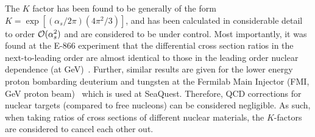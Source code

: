 The $K$ factor has been found to be generally of the form $K = \exp[(\alpha_s/2\pi)(4\pi^2/3)]$, and has been calculated in considerable detail~\cite{Matsuura:1988sm} to order $\mathcal{O}(\alpha_s^2)$ and are considered to be under control. Most importantly, it was found at the E-866 experiment that the differential cross section ratios in the next-to-leading order are almost identical to those in the leading order nuclear dependence (at \unit[800]{GeV})~\cite{Duan:2004cw}. Further, similar results are given for the lower energy proton bombarding deuterium and tungsten at the Fermilab Main Injector (FMI, \unit[120]{GeV} proton beam)~\cite{Geesaman:906prop} which is used at SeaQuest. Therefore, QCD corrections for nuclear targets (compared to free nucleons) can be considered negligible. As such, when taking ratios of cross sections of different nuclear materials, the $K$-factors are considered to cancel each other out.

